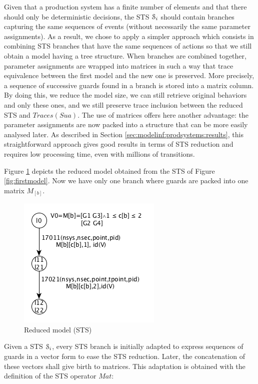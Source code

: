 Given that a production system has a finite number of elements
and that there should only be deterministic decisions, the STS
$\EuScript{S}_i$ should contain branches capturing the same
sequences of events (without necessarily the same parameter
assignments).  As a result, we chose to apply a simpler approach
which consists in combining STS branches that have the same
sequences of actions so that we still obtain a model having a
tree structure. When branches are combined together, parameter
assignments are wrapped into matrices in such a way that trace
equivalence between the first model and the new one is preserved.
More precisely, a sequence of successive guards found in a branch
is stored into a matrix column. By doing this, we reduce the
model size, we can still retrieve original behaviors and only
these ones, and we still preserve trace inclusion between the
reduced STS and $Traces(Sua)$.
The use of matrices offers here another advantage: the parameter
assignments are now packed into a structure that can be more
easily analysed later. As described in Section
\ref{sec:modelinf:prodsystems:results}, this straightforward
approach gives good results in terms of STS reduction and
requires low processing time, even with millions of transitions.

Figure \ref{fig:reduced-model} depicts the reduced model obtained
from the STS of Figure \ref{fig:firstmodel}. Now we have only one
branch where guards are packed into one matrix $M_{[b]}$.

\begin{figure}[H]
  \includegraphics[width=0.5\linewidth]{figures/STS2.png}

	\caption{Reduced model (STS)}
	\label{fig:reduced-model}
\end{figure}

Given a STS $\EuScript{S}_i$, every STS branch is initially
adapted to express sequences of guards in a vector form to ease
the STS reduction. Later, the concatenation of these vectors
shall give birth to matrices. This adaptation is obtained with
the definition of the STS operator $Mat$:


